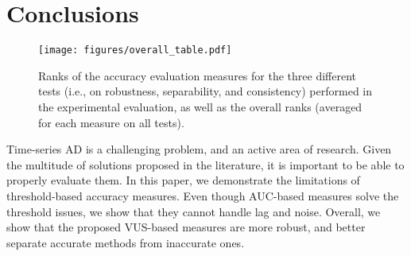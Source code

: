 \section{Conclusions}
\label{sec:conclusions}


\begin{figure}[tb]
  \centering
  \texttt{[image: figures/overall\_table.pdf]}
  \caption{Ranks of the accuracy evaluation measures for the three different tests (i.e., on robustness, separability, and consistency) performed in the experimental evaluation, as well as the overall ranks (averaged for each measure on all tests). }
  \label{fig:overalltable}
\end{figure}

Time-series AD is a challenging problem, and an active area of research. 
Given the multitude of solutions proposed in the literature, it is important to be able to properly evaluate them.
In this paper, we demonstrate the limitations of threshold-based accuracy measures. 
Even though AUC-based measures solve the threshold issues, we show that they cannot handle lag and noise. Overall, we show that the proposed VUS-based measures are more robust, and better separate accurate methods from inaccurate ones.


